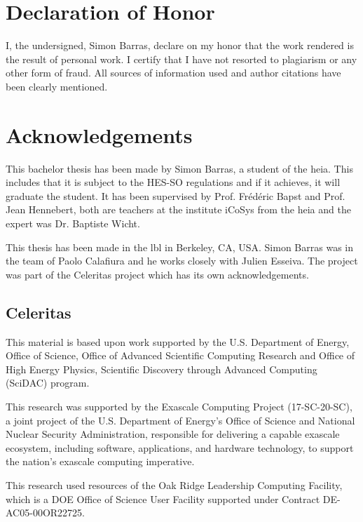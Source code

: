 \chapter{Declaration of Honor}
\label{ch:honour}
I, the undersigned, Simon Barras, declare on my honor that the work rendered is the result of
personal work. I certify that I have not resorted to plagiarism or any other form of fraud.
All sources of information used and author citations have been clearly mentioned.



\chapter{Acknowledgements}
\label{ch:remerciement}

This bachelor thesis has been made by Simon Barras, a student of the \acrlong{heia}.
This includes that it is subject to the HES-SO regulations and if it achieves, it
will graduate the student.
It has been supervised by Prof. Frédéric Bapst and Prof. Jean Hennebert, both
are teachers at the institute iCoSys from the \acrshort{heia} and the expert was Dr. Baptiste Wicht.

This thesis has been made in the \acrlong{lbl} in Berkeley, CA, USA.
Simon Barras was in the team of Paolo Calafiura and he works closely with Julien
Esseiva.
The project was part of the Celeritas project which has its own acknowledgements.

\section{Celeritas}
\label{ch:acknowledgements:celeritas}

This material is based upon work supported by the U.S. Department of Energy,
Office of Science, Office of Advanced Scientific Computing Research and Office
of High Energy Physics, Scientific Discovery through Advanced Computing (SciDAC)
program.

This research was supported by the Exascale Computing Project (17-SC-20-SC), a
joint project of the U.S. Department of Energy's Office of Science and National
Nuclear Security Administration, responsible for delivering a capable exascale
ecosystem, including software, applications, and hardware technology, to support
the nation's exascale computing imperative.

This research used resources of the Oak Ridge Leadership Computing Facility,
which is a DOE Office of Science User Facility supported under Contract
DE-AC05-00OR22725.

